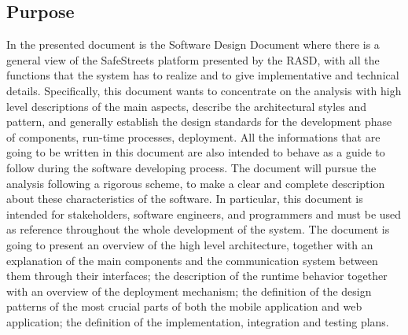 \documentclass[12pt]{article}
\begin{document}
\subsection{Purpose}
\vspace{5mm}
In the presented document is the Software Design Document where there is a general view of the SafeStreets platform presented by the
RASD, with all the functions that the system has to realize and to give implementative and technical details. Specifically, this document wants to concentrate on the analysis with high level descriptions of the main aspects, describe
the architectural styles and pattern, and generally establish the design standards for the development phase of components, run-time processes, deployment. All the informations that are going to be written in this document are also intended to behave as a guide to
follow during the software developing process.
The document will pursue the analysis following a rigorous scheme, to make a clear and complete description about these characteristics of the software.
In particular, this document is intended for stakeholders, software engineers, and programmers and must be used as reference throughout the whole development of the system. The document is going to present an overview of the high level architecture, together with an explanation of the main components and the communication system between them through their interfaces; the description of the runtime behavior together with an overview of the deployment mechanism; the definition of the design patterns of the most crucial parts of both the mobile application and web application; the definition of the implementation, integration and testing plans.
\end{document}
